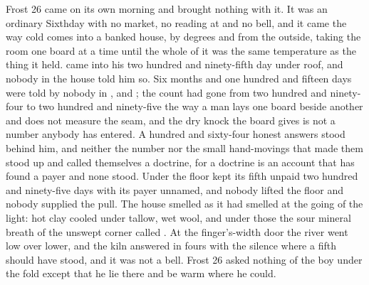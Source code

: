 
Frost 26 came on its own morning and brought nothing with it. It was an ordinary Sixthday with no market, no reading at  and no bell, and it came the way cold comes into a banked house, by degrees and from the outside, taking the room one board at a time until the whole of it was the same temperature as the thing it held.  came into his two hundred and ninety-fifth day under  roof, and nobody in the house told him so. Six months and one hundred and fifteen days were told by nobody in ,  and ; the count had gone from two hundred and ninety-four to two hundred and ninety-five the way a man lays one board beside another and does not measure the seam, and the dry knock the board gives is not a number anybody has entered. A hundred and sixty-four honest answers stood behind him, and neither the number nor the small hand-movings that made them stood up and called themselves a doctrine, for a doctrine is an account that has found a payer and none stood. Under the floor  kept its fifth unpaid two hundred and ninety-five days with its payer unnamed, and nobody lifted the floor and nobody supplied the pull. The house smelled as it had smelled at the going of the light: hot clay cooled under tallow, wet wool, and under those the sour mineral breath of the unswept corner called . At the finger's-width door the river went low over lower, and the kiln answered in fours with the silence where a fifth should have stood, and it was not a bell. Frost 26 asked nothing of the boy under the fold except that he lie there and be warm where he could.


